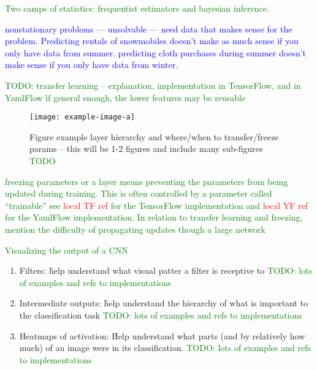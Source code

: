 \textcolor{green}{Two camps of statistics: frequentist estimators and bayesian inference.}




\textcolor{blue}{nonstationary problems --- unsolvable --- need data that makes sense for the problem. Predicting rentals of snowmobiles doesn't make as much sense if you only have data from summer. predicting cloth purchases during summer doesn't make sense if you only have data from winter.}

\textcolor{green}{TODO: transfer learning -- explanation, implementation in TensorFlow, and in YamlFlow \r{if general enough, the lower features may be reusable}}

\begin{figure}[htp]
	\centering
	\texttt{[image: example-image-a]}\hfil
	\caption{Figure example layer hierarchy and where/when to transfer/freeze params -- this will be 1-2 figures and include many sub-figures \textcolor{green}{TODO}}
	\label{fig:transfer_learning_subfigs_a}
\end{figure}

\textcolor{green}{{freezing} parameters or a layer means preventing the parameters from being updated during training. This is often controlled by a parameter called ``trainable'' see \textcolor{red}{local TF ref} for the TensorFlow implementation and \textcolor{red}{local YF ref} for the YamlFlow implementation. In relation to transfer learning and freezing, mention the difficulty of propagating updates though a large network}

\textcolor{green}{Visualizing the output of a CNN}

\begin{enumerate}
	\item Filters: \r{help understand what visual patter a filter is receptive to \textcolor{green}{TODO: lots of examples and refs to implementations}}
	\item Intermediate outputs: \r{help understand the hierarchy of what is important to the classification task \textcolor{green}{TODO: lots of examples and refs to implementations}}
	\item Heatmaps of activation: \r{Help understand what parts (and by relatively how much) of an image were in its classification. \textcolor{green}{TODO: lots of examples and refs to implementations}}
\end{enumerate}


